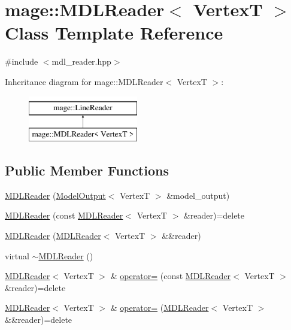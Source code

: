 \hypertarget{classmage_1_1_m_d_l_reader}{}\section{mage\+:\+:M\+D\+L\+Reader$<$ VertexT $>$ Class Template Reference}
\label{classmage_1_1_m_d_l_reader}


{\ttfamily \#include $<$mdl\+\_\+reader.\+hpp$>$}

Inheritance diagram for mage\+:\+:M\+D\+L\+Reader$<$ VertexT $>$\+:\begin{figure}[H]
\begin{center}
\leavevmode
\includegraphics[height=2.000000cm]{classmage_1_1_m_d_l_reader}
\end{center}
\end{figure}
\subsection*{Public Member Functions}
\begin{DoxyCompactItemize}
\item 
\hyperlink{classmage_1_1_m_d_l_reader_a068ed8c9101b42033ea166ab7aa03c04}{M\+D\+L\+Reader} (\hyperlink{structmage_1_1_model_output}{Model\+Output}$<$ VertexT $>$ \&model\+\_\+output)
\item 
\hyperlink{classmage_1_1_m_d_l_reader_aaabae8c4e8632423f1af18a6d99345db}{M\+D\+L\+Reader} (const \hyperlink{classmage_1_1_m_d_l_reader}{M\+D\+L\+Reader}$<$ VertexT $>$ \&reader)=delete
\item 
\hyperlink{classmage_1_1_m_d_l_reader_a6713aaf2b32b53e45dd2eead538d94dd}{M\+D\+L\+Reader} (\hyperlink{classmage_1_1_m_d_l_reader}{M\+D\+L\+Reader}$<$ VertexT $>$ \&\&reader)
\item 
virtual \hyperlink{classmage_1_1_m_d_l_reader_ae1e784f0c7449a2a34ffb90badc3d2da}{$\sim$\+M\+D\+L\+Reader} ()
\item 
\hyperlink{classmage_1_1_m_d_l_reader}{M\+D\+L\+Reader}$<$ VertexT $>$ \& \hyperlink{classmage_1_1_m_d_l_reader_aa60388b9e76eb2244f356d1d5fde2cb6}{operator=} (const \hyperlink{classmage_1_1_m_d_l_reader}{M\+D\+L\+Reader}$<$ VertexT $>$ \&reader)=delete
\item 
\hyperlink{classmage_1_1_m_d_l_reader}{M\+D\+L\+Reader}$<$ VertexT $>$ \& \hyperlink{classmage_1_1_m_d_l_reader_a69770cb607b60596e6ebd96732e92938}{operator=} (\hyperlink{classmage_1_1_m_d_l_reader}{M\+D\+L\+Reader}$<$ VertexT $>$ \&\&reader)=delete
\end{DoxyCompactItemize}
